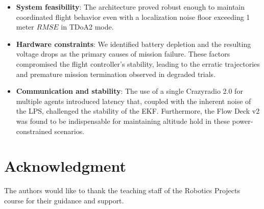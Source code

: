 \documentclass[conference]{IEEEtran}
\begin{document}
\begin{itemize}
    \item \textbf{System feasibility}: The architecture proved robust enough to maintain coordinated flight behavior even with a localization noise floor exceeding 1 meter $RMSE$ in TDoA2 mode.
    \item \textbf{Hardware constraints}: We identified battery depletion and the resulting voltage drops as the primary causes of mission failure. These factors compromised the flight controller's stability, leading to the erratic trajectories and premature mission termination observed in degraded trials.
    \item \textbf{Communication and stability}: The use of a single Crazyradio 2.0 for multiple agents introduced latency that, coupled with the inherent noise of the LPS, challenged the stability of the EKF. Furthermore, the Flow Deck v2 was found to be indispensable for maintaining altitude hold in these power-constrained scenarios.
    \end{itemize}
\section*{Acknowledgment}
The authors would like to thank the teaching staff of the Robotics Projects course for their guidance and support.



\end{document}
